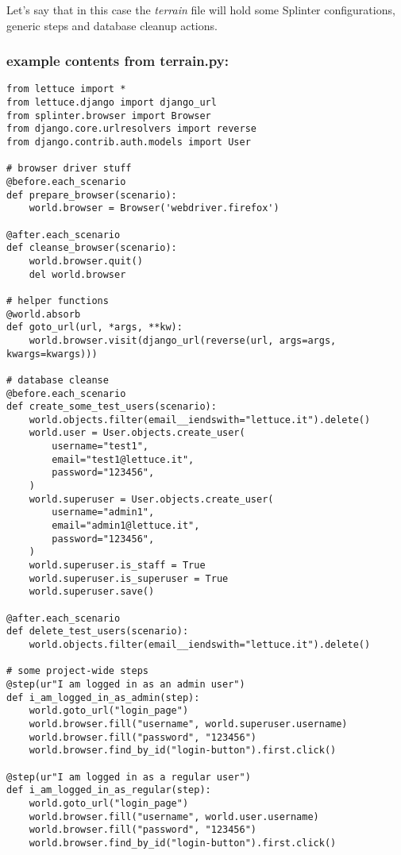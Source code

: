 \documentclass[letterpaper]{article}
\begin{document}
\noindent
Let's say that in this case the \textit{terrain} file will hold some
Splinter configurations, generic steps and database cleanup actions.

\subsubsection*{example contents from terrain.py:}

\footnotesize
\begin{verbatim}
from lettuce import *
from lettuce.django import django_url
from splinter.browser import Browser
from django.core.urlresolvers import reverse
from django.contrib.auth.models import User

# browser driver stuff
@before.each_scenario
def prepare_browser(scenario):
    world.browser = Browser('webdriver.firefox')

@after.each_scenario
def cleanse_browser(scenario):
    world.browser.quit()
    del world.browser

# helper functions
@world.absorb
def goto_url(url, *args, **kw):
    world.browser.visit(django_url(reverse(url, args=args, kwargs=kwargs)))

# database cleanse
@before.each_scenario
def create_some_test_users(scenario):
    world.objects.filter(email__iendswith="lettuce.it").delete()
    world.user = User.objects.create_user(
        username="test1",
        email="test1@lettuce.it",
        password="123456",
    )
    world.superuser = User.objects.create_user(
        username="admin1",
        email="admin1@lettuce.it",
        password="123456",
    )
    world.superuser.is_staff = True
    world.superuser.is_superuser = True
    world.superuser.save()

@after.each_scenario
def delete_test_users(scenario):
    world.objects.filter(email__iendswith="lettuce.it").delete()

# some project-wide steps
@step(ur"I am logged in as an admin user")
def i_am_logged_in_as_admin(step):
    world.goto_url("login_page")
    world.browser.fill("username", world.superuser.username)
    world.browser.fill("password", "123456")
    world.browser.find_by_id("login-button").first.click()

@step(ur"I am logged in as a regular user")
def i_am_logged_in_as_regular(step):
    world.goto_url("login_page")
    world.browser.fill("username", world.user.username)
    world.browser.fill("password", "123456")
    world.browser.find_by_id("login-button").first.click()

\end{verbatim}
\normalsize
\end{document}
